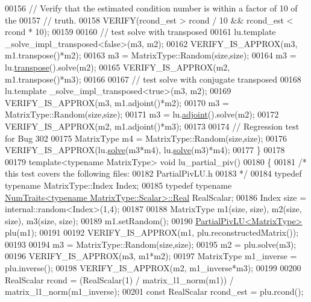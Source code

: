 \begin{DoxyCode}
00156   \textcolor{comment}{// Verify that the estimated condition number is within a factor of 10 of the}
00157   \textcolor{comment}{// truth.}
00158   VERIFY(rcond\_est > rcond / 10 && rcond\_est < rcond * 10);
00159 
00160   \textcolor{comment}{// test solve with transposed}
00161   lu.template \_solve\_impl\_transposed<false>(m3, m2);
00162   VERIFY\_IS\_APPROX(m3, m1.transpose()*m2);
00163   m3 = MatrixType::Random(size,size);
00164   m3 = lu.\hyperlink{class_eigen_1_1_solver_base_a732e75b5132bb4db3775916927b0e86c}{transpose}().solve(m2);
00165   VERIFY\_IS\_APPROX(m2, m1.transpose()*m3);
00166 
00167   \textcolor{comment}{// test solve with conjugate transposed}
00168   lu.template \_solve\_impl\_transposed<true>(m3, m2);
00169   VERIFY\_IS\_APPROX(m3, m1.adjoint()*m2);
00170   m3 = MatrixType::Random(size,size);
00171   m3 = lu.\hyperlink{class_eigen_1_1_solver_base_a05a3686a89888681c8e0c2bcab6d1ce5}{adjoint}().solve(m2);
00172   VERIFY\_IS\_APPROX(m2, m1.adjoint()*m3);
00173 
00174   \textcolor{comment}{// Regression test for Bug 302}
00175   MatrixType m4 = MatrixType::Random(size,size);
00176   VERIFY\_IS\_APPROX(lu.\hyperlink{group___l_u___module_af563471f6f3283fd10779ef02dd0b748}{solve}(m3*m4), lu.\hyperlink{group___l_u___module_af563471f6f3283fd10779ef02dd0b748}{solve}(m3)*m4);
00177 \}
00178 
00179 \textcolor{keyword}{template}<\textcolor{keyword}{typename} MatrixType> \textcolor{keywordtype}{void} lu\_partial\_piv()
00180 \{
00181   \textcolor{comment}{/* this test covers the following files:}
00182 \textcolor{comment}{     PartialPivLU.h}
00183 \textcolor{comment}{  */}
00184   \textcolor{keyword}{typedef} \textcolor{keyword}{typename} MatrixType::Index Index;
00185   \textcolor{keyword}{typedef} \textcolor{keyword}{typename} \hyperlink{group___core___module_struct_eigen_1_1_num_traits}{NumTraits<typename MatrixType::Scalar>::Real}
       RealScalar;
00186   Index size = internal::random<Index>(1,4);
00187 
00188   MatrixType m1(size, size), m2(size, size), m3(size, size);
00189   m1.setRandom();
00190   \hyperlink{group___l_u___module_class_eigen_1_1_partial_piv_l_u}{PartialPivLU<MatrixType>} plu(m1);
00191 
00192   VERIFY\_IS\_APPROX(m1, plu.reconstructedMatrix());
00193 
00194   m3 = MatrixType::Random(size,size);
00195   m2 = plu.solve(m3);
00196   VERIFY\_IS\_APPROX(m3, m1*m2);
00197   MatrixType m1\_inverse = plu.inverse();
00198   VERIFY\_IS\_APPROX(m2, m1\_inverse*m3);
00199 
00200   RealScalar rcond = (RealScalar(1) / matrix\_l1\_norm(m1)) / matrix\_l1\_norm(m1\_inverse);
00201   \textcolor{keyword}{const} RealScalar rcond\_est = plu.rcond();

\end{DoxyCode}
